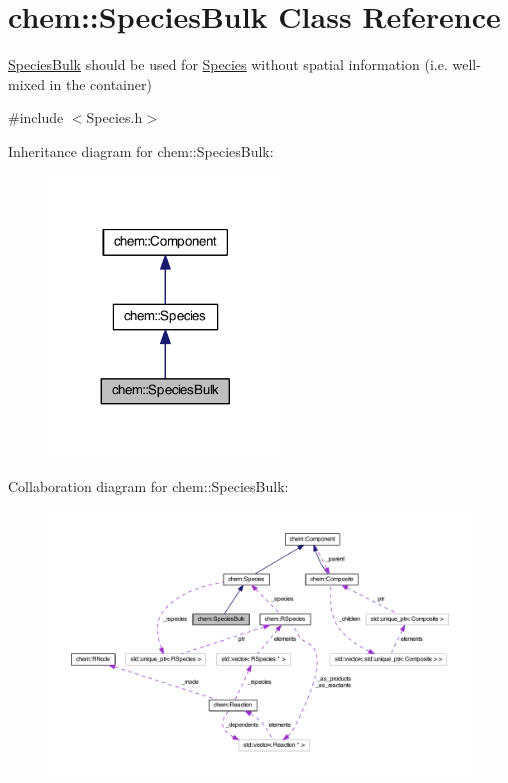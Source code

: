 \hypertarget{classchem_1_1SpeciesBulk}{\section{chem\-:\-:Species\-Bulk Class Reference}
\label{classchem_1_1SpeciesBulk}
}


\hyperlink{classchem_1_1SpeciesBulk}{Species\-Bulk} should be used for \hyperlink{classchem_1_1Species}{Species} without spatial information (i.\-e. well-\/mixed in the container)  




{\ttfamily \#include $<$Species.\-h$>$}



Inheritance diagram for chem\-:\-:Species\-Bulk\-:\nopagebreak
\begin{figure}[H]
\begin{center}
\leavevmode
\includegraphics[width=176pt]{classchem_1_1SpeciesBulk__inherit__graph}
\end{center}
\end{figure}


Collaboration diagram for chem\-:\-:Species\-Bulk\-:\nopagebreak
\begin{figure}[H]
\begin{center}
\leavevmode
\includegraphics[width=350pt]{classchem_1_1SpeciesBulk__coll__graph}
\end{center}
\end{figure}
